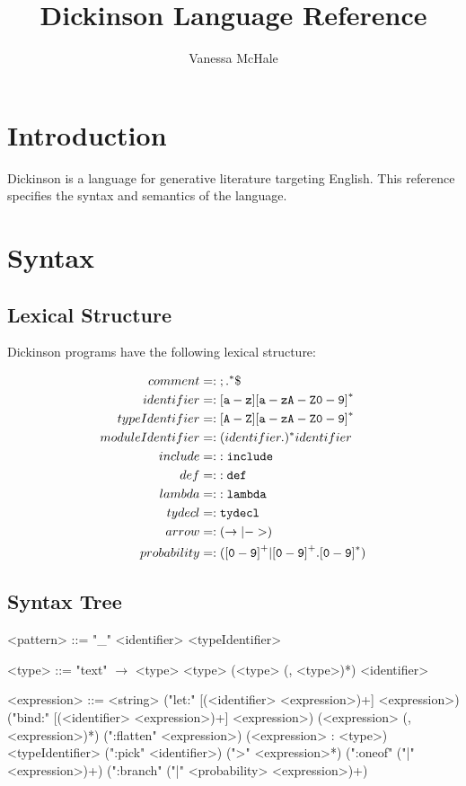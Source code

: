 \documentclass{report}
\begin{document}
\title{Dickinson Language Reference}
\author {Vanessa McHale}
\maketitle

\tableofcontents

\section{Introduction}

Dickinson is a language for generative literature targeting English. This reference specifies the syntax and semantics of the language.

\section{Syntax}

\subsection{Lexical Structure}

Dickinson programs have the following lexical structure:

\begin{align*}
    comment &=: {\tt ; .}^*\$ \\
    identifier &=: {\tt [a-z][a-zA-Z0-9]}^* \\
    typeIdentifier &=: {\tt [A-Z][a-zA-Z0-9]}^* \\
    moduleIdentifier &=: (identifier.)^* identifier \\
    include &=: {\tt :include} \\
    def &=: {\tt :def} \\
    lambda &=: {\tt :lambda} \\
    tydecl &=: {\tt tydecl} \\
    arrow &=: (\rightarrow | {\tt ->}) \\
    probability &=: ({\tt [0-9]}^+| {\tt [0-9]}^+.{\tt [0-9]}^*)
\end{align*}

\subsection{Syntax Tree}

\setlength{\grammarparsep}{20pt plus 1pt minus 1pt}
\setlength{\grammarindent}{12em}

\begin{grammar}
<pattern> ::= "_"
          \alt <identifier>
          \alt <typeIdentifier>

<type> ::= "text"
\alt $\rightarrow$ <type> <type>
\alt (<type> (, <type>)*)
\alt <identifier>

<expression> ::= <string>
\alt ("let:" [(<identifier> <expression>)+] <expression>)
\alt ("bind:" [(<identifier> <expression>)+] <expression>)
\alt (<expression> (, <expression>)*)
\alt (":flatten" <expression>)
\alt (<expression> : <type>)
\alt <typeIdentifier>
\alt (":pick" <identifier>)
\alt (">" <expression>*)
\alt (":oneof" ("|" <expression>)+)
\alt (":branch" ("|" <probability> <expression>)+)
\end{grammar}
\end{document}

